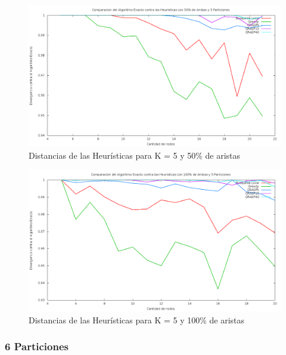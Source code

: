 \begin{figure}[H]
\begin{center}
\includegraphics[scale=0.3]{finales/ComparacionesCon5Particiones50Aristas.png}
\caption{Distancias de las Heur\'isticas para K = 5 y 50\% de aristas}
\end{center}
\end{figure}

\begin{figure}[H]
\begin{center}
\includegraphics[scale=0.3]{finales/ComparacionesCon5Particiones100Aristas.png}
\caption{Distancias de las Heur\'isticas para K = 5 y 100\% de aristas}
\end{center}
\end{figure}

\subsubsection{6 Particiones}

